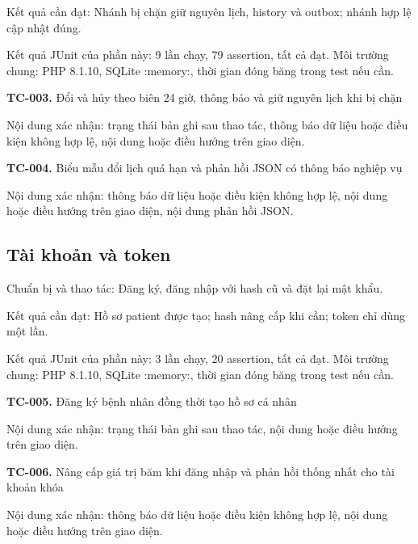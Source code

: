 Kết quả cần đạt:\allowbreak{} Nhánh bị chặn giữ nguyên lịch, history và outbox; nhánh hợp lệ cập nhật đúng.\allowbreak{}

Kết quả JUnit của phần này:\allowbreak{} 9 lần chạy, 79 assertion, tất cả đạt.\allowbreak{} Môi trường chung:\allowbreak{} PHP 8.\allowbreak{}1.\allowbreak{}10, SQLite :\allowbreak{}memory:\allowbreak{}, thời gian đóng băng trong test nếu cần.\allowbreak{}

\noindent\textbf{TC-003.} Đổi và hủy theo biên 24 giờ, thông báo và giữ nguyên lịch khi bị chặn\par
Nội dung xác nhận:\allowbreak{} trạng thái bản ghi sau thao tác, thông báo dữ liệu hoặc điều kiện không hợp lệ, nội dung hoặc điều hướng trên giao diện.\allowbreak{}

\noindent\textbf{TC-004.} Biểu mẫu đổi lịch quá hạn và phản hồi JSON có thông báo nghiệp vụ\par
Nội dung xác nhận:\allowbreak{} thông báo dữ liệu hoặc điều kiện không hợp lệ, nội dung hoặc điều hướng trên giao diện, nội dung phản hồi JSON.\allowbreak{}


\par\vspace{8pt}

\subsection{Tài khoản và token}
Chuẩn bị và thao tác:\allowbreak{} Đăng ký, đăng nhập với hash cũ và đặt lại mật khẩu.\allowbreak{}

Kết quả cần đạt:\allowbreak{} Hồ sơ patient được tạo; hash nâng cấp khi cần; token chỉ dùng một lần.\allowbreak{}

Kết quả JUnit của phần này:\allowbreak{} 3 lần chạy, 20 assertion, tất cả đạt.\allowbreak{} Môi trường chung:\allowbreak{} PHP 8.\allowbreak{}1.\allowbreak{}10, SQLite :\allowbreak{}memory:\allowbreak{}, thời gian đóng băng trong test nếu cần.\allowbreak{}

\noindent\textbf{TC-005.} Đăng ký bệnh nhân đồng thời tạo hồ sơ cá nhân\par
Nội dung xác nhận:\allowbreak{} trạng thái bản ghi sau thao tác, nội dung hoặc điều hướng trên giao diện.\allowbreak{}

\noindent\textbf{TC-006.} Nâng cấp giá trị băm khi đăng nhập và phản hồi thống nhất cho tài khoản khóa\par
Nội dung xác nhận:\allowbreak{} thông báo dữ liệu hoặc điều kiện không hợp lệ, nội dung hoặc điều hướng trên giao diện.\allowbreak{}

